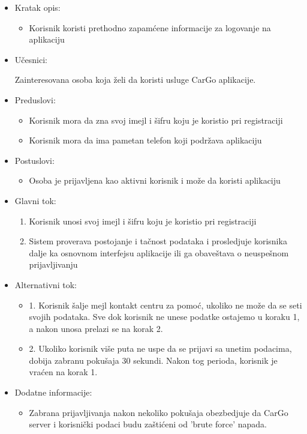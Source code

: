 \begin{itemize}
    \item Kratak opis:
        \begin{itemize}
            \item Korisnik koristi prethodno zapamćene informacije za logovanje na aplikaciju
        \end{itemize}
    \item Učesnici:
        \begin{itemize}
            Zainteresovana osoba koja želi da koristi usluge CarGo aplikacije.
        \end{itemize}
    \item Preduslovi:
        \begin{itemize}
            \item Korisnik mora da zna svoj imejl i šifru koju je koristio pri registraciji
            \item Korisnik mora da ima pametan telefon koji podržava aplikaciju
        \end{itemize}
    \item Postuslovi:
        \begin{itemize}
            \item Osoba je prijavljena kao aktivni korisnik i može da koristi aplikaciju
        \end{itemize}
    \item Glavni tok:
        \begin{enumerate}
            \item Korisnik unosi svoj imejl i šifru koju je koristio pri registraciji
            \item Sistem proverava postojanje i tačnost podataka i prosledjuje korisnika dalje ka osnovnom interfejsu aplikacije ili ga obaveštava o neuspešnom prijavljivanju
        \end{enumerate}
    \item Alternativni tok:
        \begin{itemize}
            \item 1. Korisnik šalje mejl kontakt centru za pomoć, ukoliko ne može da se seti svojih podataka. Sve dok korisnik ne unese podatke ostajemo u koraku 1, a nakon unosa prelazi se na korak 2.
            \item 2. Ukoliko korisnik više puta ne uspe da se prijavi sa unetim podacima, dobija zabranu pokušaja 30 sekundi. Nakon tog perioda, korisnik je vraćen na korak 1.
        \end{itemize}
    \item Dodatne informacije:
        \begin{itemize}
            \item Zabrana prijavljivanja nakon nekoliko pokušaja obezbedjuje da CarGo server i korisnički podaci budu zaštićeni od 'brute force' napada.
        \end{itemize}
\end{itemize}


